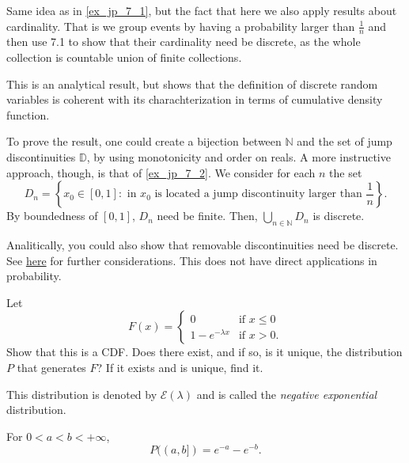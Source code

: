 \begin{my_ex}
	
\end{my_ex}
\begin{my_remark}
	\label{ex_jp_7_2}
	Same idea as in \ref{ex_jp_7_1}, but the fact that here we also apply results about cardinality. That is we group events by having a probability larger than $\frac{1}{n}$ and then use 7.1 to show that their cardinality need be discrete, as the whole collection is countable union of finite collections.
\end{my_remark}

\begin{my_ex}
	
\end{my_ex}
\begin{my_remark}
	This is an analytical result, but shows that the definition of discrete random variables is coherent with its charachterization in terms of cumulative density function. 
	
	To prove the result, one could create a bijection between $\mathbb{N}$ and the set of jump discontinuities $\mathbb{D}$, by using monotonicity and order on reals.
	A more instructive approach, though, is that of \ref{ex_jp_7_2}. We consider for each $n$ the set
	\[ 
		D_n = 
		\left\{
			x_0 \in [0,1] : 
			\text{ in } x_0 \text{ is located a jump discontinuity larger than } 
			\frac{1}{n}
		\right\}.
	\]
	By boundedness of $[0,1]$, $D_n$ need be finite. Then, $\bigcup_{n\in\mathbb{N}} D_n$ is discrete. 
	
	Analitically, you could also show that removable discontinuities need be discrete. See \href{run:assets/removable_disc.pdf}{here} for further considerations. This does not have direct applications in probability.
\end{my_remark}

\begin{my_ex}
	Let
	\[
		F(x)=
		\begin{cases}
			0 & \text{if } x \leq 0 \\
			1-e^{-\lambda x} & \text{if } x > 0.
		\end{cases}	
	\]
	Show that this is a CDF. Does there exist, and if so, is it unique, the distribution $P$ that generates $F$? If it exists and is unique, find it.
	
	This distribution is denoted by $\mathcal{E}(\lambda)$ and is called the \textit{negative exponential} distribution.
	\end{my_ex}
	\begin{my_remark}
	For $0<a<b<+\infty$,
	\[
		P((a,b]) = e^{-a} - e^{-b}.	
	\]
	\end{my_remark}
	
